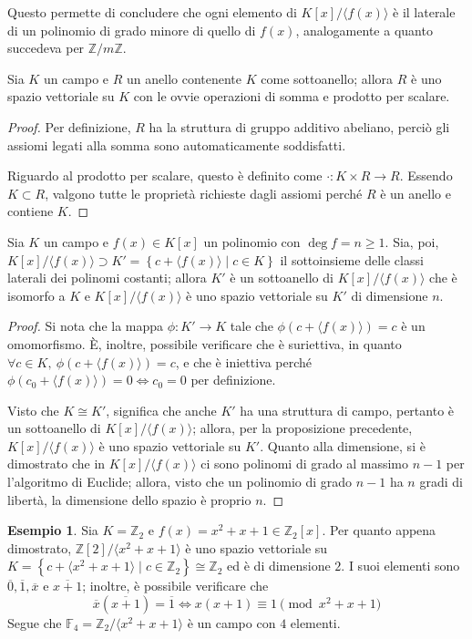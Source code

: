 \documentclass[11pt, a4paper]{scrartcl}
\theoremstyle{definition}
\newtheorem{esempio}{Esempio}
\numberwithin{esempio}{section}
\theoremstyle{definition}
\numberwithin{obs}{section}
\numberwithin{nota}{section}
\numberwithin{equation}{subsection}
\begin{document}
Questo permette di concludere che ogni elemento di $K[x] / \langle f(x) \rangle$ \`e il laterale di un polinomio di grado minore di quello di $f(x)$, analogamente a quanto succedeva per $\mathbb{Z} / m\mathbb{Z}$.
\begin{prop}
	{}{}
	Sia $K$ un campo e $R$ un anello contenente $K$ come sottoanello; allora $R$ \`e uno spazio vettoriale su $K$ con le ovvie operazioni di somma e prodotto per scalare.
	\begin{proof}
		Per definizione, $R$ ha la struttura di gruppo additivo abeliano, perci\`o gli assiomi legati alla somma sono automaticamente soddisfatti.

		Riguardo al prodotto per scalare, questo \`e definito come $\cdot : K \times R \to R$.
		Essendo $K \subset R$, valgono tutte le propriet\`a richieste dagli assiomi perch\'e $R$ \`e un anello e contiene $K$.
	\end{proof}
\end{prop}
\begin{prop}
	{}{}
	Sia $K$ un campo e $f(x) \in K[x]$ un polinomio con $\operatorname{deg} f = n\ge 1$. 
	Sia, poi, $K[x] / \langle f(x) \rangle \supset K' = \left\{ c + \langle f(x) \rangle  \mid c \in K\right\} $ il sottoinsieme delle classi laterali dei polinomi costanti; allora $K'$ \`e un sottoanello di $K[x] / \langle f(x) \rangle$ che \`e isomorfo a $K$ e $K[x] / \langle f(x) \rangle$ \`e uno spazio vettoriale su $K'$ di dimensione $n$.
	\begin{proof}
		Si nota che la mappa $\phi : K' \to K $ tale che $\phi (c+ \langle f(x) \rangle) = c$ \`e un omomorfismo.
		\`E, inoltre, possibile verificare che \`e suriettiva, in quanto $\forall c \in K, \ \phi (c + \langle f(x) \rangle) = c$, e che \`e iniettiva perch\'e $\phi (c_0+\langle f(x) \rangle) = 0 \iff c_0 = 0$ per definizione.

		Visto che $K\cong K'$, significa che anche $K'$ ha una struttura di campo, pertanto \`e un sottoanello di $K[x] / \langle f(x) \rangle$; allora, per la proposizione precedente, $K[x] / \langle f(x) \rangle$ \`e uno spazio vettoriale su $K'$.
		Quanto alla dimensione, si \`e dimostrato che in $K[x] / \langle f(x) \rangle$ ci sono polinomi di grado al massimo $n-1$ per l'algoritmo di Euclide; allora, visto che un polinomio di grado $n-1$ ha $n$ gradi di libert\`a, la dimensione dello spazio \`e proprio $n$.
	\end{proof}
\end{prop}
\begin{esempio}
	Sia $K = \mathbb{Z}_2$ e $f(x) = x^2 + x + 1 \in \mathbb{Z}_2[x]$.
	Per quanto appena dimostrato, $\mathbb{Z}[2] / \langle x^2 + x + 1 \rangle$ \`e uno spazio vettoriale su $K = \left\{ c + \langle x^2 + x + 1 \rangle  \mid c \in \mathbb{Z}_2 \right\} \cong \mathbb{Z}_2$ ed \`e di dimensione $2$.
	I suoi elementi sono $\overline{0}, \overline{1}, \overline{x}$ e $\overline{x+1}$; inoltre, \`e possibile verificare che
	\[
	\overline{x}(\overline{x+1}) = \overline{1}\iff x(x+1) \equiv 1 \pmod{x^2 + x +1} 
	\] 
	Segue che $\mathbb{F}_4 = \mathbb{Z}_2 / \langle x^2 + x + 1 \rangle$ \`e un campo con $4$ elementi.
\end{esempio}
\end{document}

